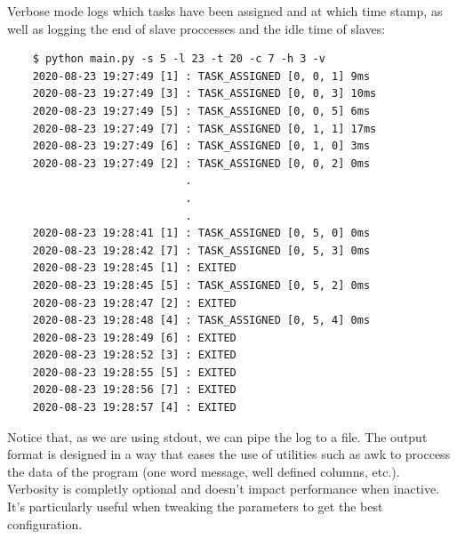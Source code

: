   Verbose mode logs which tasks have been assigned and at which time stamp, as
  well as logging the end of slave proccesses and the idle time of slaves:

  \begin{lstlisting}
    $ python main.py -s 5 -l 23 -t 20 -c 7 -h 3 -v
    2020-08-23 19:27:49 [1] : TASK_ASSIGNED [0, 0, 1] 9ms
    2020-08-23 19:27:49 [3] : TASK_ASSIGNED [0, 0, 3] 10ms
    2020-08-23 19:27:49 [5] : TASK_ASSIGNED [0, 0, 5] 6ms
    2020-08-23 19:27:49 [7] : TASK_ASSIGNED [0, 1, 1] 17ms
    2020-08-23 19:27:49 [6] : TASK_ASSIGNED [0, 1, 0] 3ms
    2020-08-23 19:27:49 [2] : TASK_ASSIGNED [0, 0, 2] 0ms
                            .
                            .
                            .
    2020-08-23 19:28:41 [1] : TASK_ASSIGNED [0, 5, 0] 0ms
    2020-08-23 19:28:42 [7] : TASK_ASSIGNED [0, 5, 3] 0ms
    2020-08-23 19:28:45 [1] : EXITED
    2020-08-23 19:28:45 [5] : TASK_ASSIGNED [0, 5, 2] 0ms
    2020-08-23 19:28:47 [2] : EXITED
    2020-08-23 19:28:48 [4] : TASK_ASSIGNED [0, 5, 4] 0ms
    2020-08-23 19:28:49 [6] : EXITED
    2020-08-23 19:28:52 [3] : EXITED
    2020-08-23 19:28:55 [5] : EXITED
    2020-08-23 19:28:56 [7] : EXITED
    2020-08-23 19:28:57 [4] : EXITED

  \end{lstlisting}

  Notice that, as we are using stdout, we can pipe the log to a file. The
  output format is designed in a way that eases the use of utilities such as
  awk to proccess the data of the program (one word message, well defined
  columns, etc.).\\

  Verbosity is completly optional and doesn't impact performance when inactive.
  It's particularly useful when tweaking the parameters to get the best
  configuration.\\
